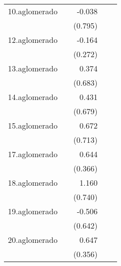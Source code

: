 {\begin{longtable}{l*{4}{D{.}{.}{-1}}}
\addlinespace
10.aglomerado&                     &      -0.038         &                     &                     \\
            &                     &     (0.795)         &                     &                     \\
\addlinespace
12.aglomerado&                     &      -0.164         &                     &                     \\
            &                     &     (0.272)         &                     &                     \\
\addlinespace
13.aglomerado&                     &       0.374         &                     &                     \\
            &                     &     (0.683)         &                     &                     \\
\addlinespace
14.aglomerado&                     &       0.431         &                     &                     \\
            &                     &     (0.679)         &                     &                     \\
\addlinespace
15.aglomerado&                     &       0.672         &                     &                     \\
            &                     &     (0.713)         &                     &                     \\
\addlinespace
17.aglomerado&                     &       0.644         &                     &                     \\
            &                     &     (0.366)         &                     &                     \\
\addlinespace
18.aglomerado&                     &       1.160         &                     &                     \\
            &                     &     (0.740)         &                     &                     \\
\addlinespace
19.aglomerado&                     &      -0.506         &                     &                     \\
            &                     &     (0.642)         &                     &                     \\
\addlinespace
20.aglomerado&                     &       0.647         &                     &                     \\
            &                     &     (0.356)         &                     &                     \\

\end{longtable}}
